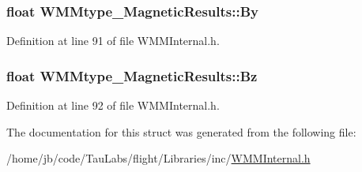 \hypertarget{struct_w_m_mtype___magnetic_results_aa6dcc4f5525f563fd38032ca8ffbf02d}{
\subsubsection[{\-By}]{\setlength{\rightskip}{0pt plus 5cm}float {\bf \-W\-M\-Mtype\-\_\-\-Magnetic\-Results\-::\-By}}}\label{struct_w_m_mtype___magnetic_results_aa6dcc4f5525f563fd38032ca8ffbf02d}


\-Definition at line 91 of file \-W\-M\-M\-Internal.\-h.

\hypertarget{struct_w_m_mtype___magnetic_results_acdc0be68c71feef834382316e7ea69de}{
\subsubsection[{\-Bz}]{\setlength{\rightskip}{0pt plus 5cm}float {\bf \-W\-M\-Mtype\-\_\-\-Magnetic\-Results\-::\-Bz}}}\label{struct_w_m_mtype___magnetic_results_acdc0be68c71feef834382316e7ea69de}


\-Definition at line 92 of file \-W\-M\-M\-Internal.\-h.



\-The documentation for this struct was generated from the following file\-:\begin{DoxyCompactItemize}
\item 
/home/jb/code/\-Tau\-Labs/flight/\-Libraries/inc/\hyperlink{_w_m_m_internal_8h}{\-W\-M\-M\-Internal.\-h}\end{DoxyCompactItemize}
